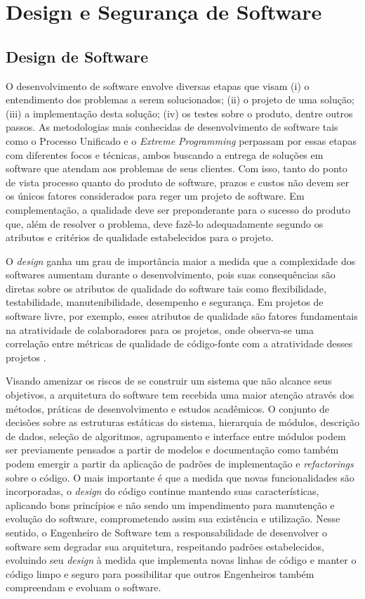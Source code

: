 \chapter{Design e Segurança de Software}
\label{cap-metrics}

\section{Design de Software}
\label{sec-design-sw}

O desenvolvimento de software envolve diversas etapas que visam (i) o entendimento dos problemas a serem solucionados; (ii) o projeto de uma solução; (iii) a implementação desta solução; (iv) os testes sobre o produto, dentre outros passos.
%
As metodologias mais conhecidas de desenvolvimento de software tais como o Processo Unificado e o \emph{Extreme Programming} perpassam por essas etapas com diferentes focos e técnicas, ambos buscando a entrega de soluções em software que atendam aos problemas de seus clientes.
%
Com isso, tanto do ponto de vista processo quanto do produto de software, prazos e custos não devem ser os únicos fatores considerados para reger um projeto de software. Em complementação, a qualidade deve ser preponderante para o sucesso do produto que, além de resolver o problema, deve fazê-lo adequadamente segundo os atributos e critérios de qualidade estabelecidos para o projeto.

%

O \emph{design} ganha um grau de importância maior a medida que a complexidade dos softwares aumentam durante o desenvolvimento, pois suas consequências são diretas sobre os atributos de qualidade do software tais como flexibilidade, testabilidade, manutenibilidade, desempenho e segurança. Em projetos de software livre, por exemplo, esses atributos de qualidade são fatores fundamentais na atratividade de colaboradores para os projetos, onde observa-se uma correlação entre métricas de qualidade de código-fonte com a atratividade desses projetos \cite{meirelles2010sbes}. 


Visando amenizar os riscos de se construir um sistema que não alcance seus objetivos, a arquitetura do software tem recebida uma maior atenção através dos métodos, práticas de desenvolvimento e estudos acadêmicos.
%
O conjunto de decisões sobre as estruturas estáticas do sistema, hierarquia de módulos, descrição de dados, seleção de algoritmos, agrupamento e interface entre módulos podem ser previamente pensados a partir de modelos e documentação como também podem emergir a partir da aplicação de padrões de implementação e \emph{refactorings} sobre o código.
%
O mais importante é que a medida que novas funcionalidades são incorporadas, o \emph{design} do código continue mantendo suas características, aplicando bons princípios e não sendo um impendimento para manutenção e evolução do software, comprometendo assim sua existência e utilização.
%
Nesse sentido, o Engenheiro de Software tem a responsabilidade de desenvolver o software sem degradar sua arquitetura, respeitando padrões estabelecidos, evoluindo seu \emph{design} à medida que implementa novas linhas de código e manter o código limpo e seguro para possibilitar que outros Engenheiros também compreendam e evoluam o software.

